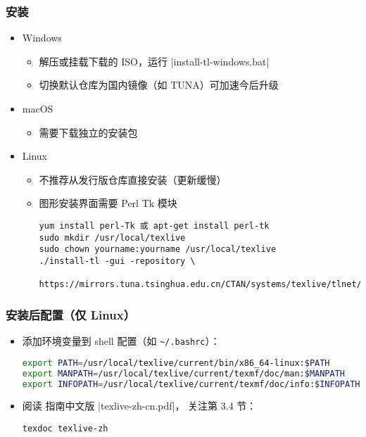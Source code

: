 \begin{frame}[fragile]
  \frametitle{安装 \TL}
  \begin{itemize}
    \item Windows
      \begin{itemize}
        \item 解压或挂载下载的 ISO，运行 |install-tl-windows.bat|
        \item 切换默认仓库为国内镜像（如 TUNA）可加速今后升级
      \end{itemize}
    \item macOS
      \begin{itemize}
        \item 需要下载独立的安装包 
      \end{itemize}
    \item Linux
      \begin{itemize}
        \item 不推荐从发行版仓库直接安装（更新缓慢）
        \item 图形安装界面需要 Perl Tk 模块
          \begin{lstlisting}
yum install perl-Tk 或 apt-get install perl-tk
sudo mkdir /usr/local/texlive
sudo chown yourname:yourname /usr/local/texlive
./install-tl -gui -repository \
  https://mirrors.tuna.tsinghua.edu.cn/CTAN/systems/texlive/tlnet/
        \end{lstlisting}
      \end{itemize}
\end{itemize}
\end{frame}

\begin{frame}[fragile]
  \frametitle{\TL 安装后配置（仅 Linux）}
  \begin{itemize}
    \item
      添加环境变量到 shell 配置（如 \nolinkurl{~/.bashrc}）：
      \begin{lstlisting}[language=bash]
export PATH=/usr/local/texlive/current/bin/x86_64-linux:$PATH
export MANPATH=/usr/local/texlive/current/texmf/doc/man:$MANPATH
export INFOPATH=/usr/local/texlive/current/texmf/doc/info:$INFOPATH
      \end{lstlisting}
  \item
    阅读 \TeXLive 指南中文版 |texlive-zh-cn.pdf|，
    关注第 3.4 节：
      \begin{lstlisting}[basicstyle=\ttfamily]
texdoc texlive-zh
      \end{lstlisting}
  \end{itemize}
\end{frame}

